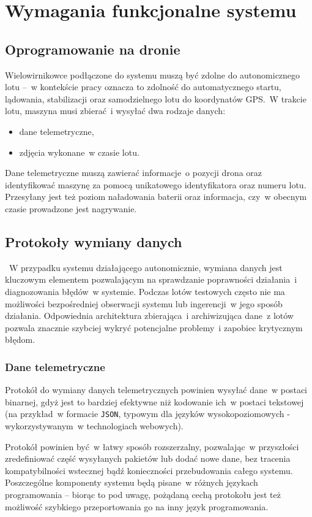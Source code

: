 \chapter{Wymagania funkcjonalne systemu} \label{chapter_functional_requirements}

\section{Oprogramowanie na dronie}

Wielowirnikowce podłączone do systemu muszą być
zdolne do autonomicznego lotu --~w kontekście pracy
oznacza to zdolność do automatycznego startu,
lądowania, stabilizacji oraz samodzielnego
lotu do koordynatów GPS.~W trakcie lotu, maszyna musi
zbierać~i wysyłać dwa rodzaje danych:
\begin{itemize}
    \item dane telemetryczne,
    \item zdjęcia wykonane~w czasie lotu.
\end{itemize}

Dane telemetryczne muszą zawierać informacje~o pozycji
drona oraz identyfikować maszynę za pomocą unikatowego
identyfikatora oraz numeru lotu. Przesyłany jest też
poziom naładowania baterii oraz informacja, czy~w obecnym
czasie prowadzone jest nagrywanie.

\section{Protokoły wymiany danych}
~W przypadku systemu działającego autonomicznie, wymiana danych jest kluczowym
elementem pozwalającym na sprawdzanie poprawności działania~i diagnozowania błędów~w systemie. Podczas lotów testowych
często nie ma możliwości bezpośredniej obserwacji systemu
lub ingerencji~w jego sposób działania. Odpowiednia architektura
zbierająca~i archiwizująca dane~z lotów pozwala znacznie szybciej 
wykryć potencjalne problemy~i zapobiec krytycznym błędom. 

\subsection{Dane telemetryczne}
Protokół do wymiany danych telemetrycznych powinien
wysyłać dane~w postaci binarnej, gdyż jest to bardziej
efektywne niż kodowanie ich~w postaci tekstowej (na
przykład~w formacie \texttt{JSON}, typowym dla języków
wysokopoziomowych - wykorzystywanym~w technologiach webowych).

Protokół powinien być~w łatwy sposób rozszerzalny,
pozwalając~w przyszłości zredefiniować część wysyłanych
pakietów lub dodać nowe dane, bez tracenia kompatybilności
wstecznej bądź konieczności przebudowania całego systemu.
Poszczególne komponenty systemu będą pisane~w różnych
językach programowania -- biorąc to pod uwagę, pożądaną
cechą protokołu jest też możliwość szybkiego przeportowania
go na inny język programowania. 

